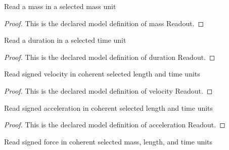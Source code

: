 \begin{definition}
  \label{def:physics:phyx-mini-0801:phyxminiproblems-problemphyxmini0801-massreadout}
  Read a mass in a selected mass unit
\end{definition}
\begin{proof}
  This is the declared model definition of mass Readout.
\end{proof}
\begin{definition}
  \label{def:physics:phyx-mini-0801:phyxminiproblems-problemphyxmini0801-durationreadout}
  Read a duration in a selected time unit
\end{definition}
\begin{proof}
  This is the declared model definition of duration Readout.
\end{proof}
\begin{definition}
  \label{def:physics:phyx-mini-0801:phyxminiproblems-problemphyxmini0801-velocityreadout}
  Read signed velocity in coherent selected length and time units
\end{definition}
\begin{proof}
  This is the declared model definition of velocity Readout.
\end{proof}
\begin{definition}
  \label{def:physics:phyx-mini-0801:phyxminiproblems-problemphyxmini0801-accelerationreadout}
  Read signed acceleration in coherent selected length and time units
\end{definition}
\begin{proof}
  This is the declared model definition of acceleration Readout.
\end{proof}
\begin{definition}
  \label{def:physics:phyx-mini-0801:phyxminiproblems-problemphyxmini0801-forcereadout}
  Read signed force in coherent selected mass, length, and time units
\end{definition}
